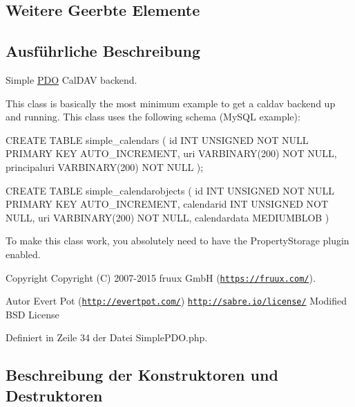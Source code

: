 \subsection*{Weitere Geerbte Elemente}


\subsection{Ausführliche Beschreibung}
Simple \mbox{\hyperlink{class_sabre_1_1_cal_d_a_v_1_1_backend_1_1_p_d_o}{P\+DO}} Cal\+D\+AV backend.

This class is basically the most minimum example to get a caldav backend up and running. This class uses the following schema (My\+S\+QL example)\+:

C\+R\+E\+A\+TE T\+A\+B\+LE simple\+\_\+calendars ( id I\+NT U\+N\+S\+I\+G\+N\+ED N\+OT N\+U\+LL P\+R\+I\+M\+A\+RY K\+EY A\+U\+T\+O\+\_\+\+I\+N\+C\+R\+E\+M\+E\+NT, uri V\+A\+R\+B\+I\+N\+A\+R\+Y(200) N\+OT N\+U\+LL, principaluri V\+A\+R\+B\+I\+N\+A\+R\+Y(200) N\+OT N\+U\+LL );

C\+R\+E\+A\+TE T\+A\+B\+LE simple\+\_\+calendarobjects ( id I\+NT U\+N\+S\+I\+G\+N\+ED N\+OT N\+U\+LL P\+R\+I\+M\+A\+RY K\+EY A\+U\+T\+O\+\_\+\+I\+N\+C\+R\+E\+M\+E\+NT, calendarid I\+NT U\+N\+S\+I\+G\+N\+ED N\+OT N\+U\+LL, uri V\+A\+R\+B\+I\+N\+A\+R\+Y(200) N\+OT N\+U\+LL, calendardata M\+E\+D\+I\+U\+M\+B\+L\+OB )

To make this class work, you absolutely need to have the Property\+Storage plugin enabled.

\begin{DoxyCopyright}{Copyright}
Copyright (C) 2007-\/2015 fruux GmbH (\href{https://fruux.com/}{\tt https\+://fruux.\+com/}). 
\end{DoxyCopyright}
\begin{DoxyAuthor}{Autor}
Evert Pot (\href{http://evertpot.com/}{\tt http\+://evertpot.\+com/})  \href{http://sabre.io/license/}{\tt http\+://sabre.\+io/license/} Modified B\+SD License 
\end{DoxyAuthor}


Definiert in Zeile 34 der Datei Simple\+P\+D\+O.\+php.



\subsection{Beschreibung der Konstruktoren und Destruktoren}
\mbox{\label{class_sabre_1_1_cal_d_a_v_1_1_backend_1_1_simple_p_d_o_ab4b9f4ee595f715c27f62774c649163b}} 
